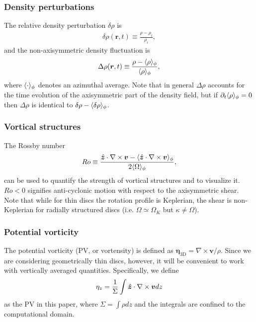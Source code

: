 \subsubsection{Density perturbations}
The relative density perturbation $\delta\rho$ is 
\begin{align}
  \delta\rho(\bm{r},t) \equiv \frac{\rho - \rho_i}{\rho_i}, 
\end{align}
and the non-axisymmetric density fluctuation is 
\begin{align}
  \Delta\rho(\bm{r},t) \equiv \frac{\rho -
    \langle \rho \rangle_\phi}{\langle \rho \rangle_\phi}, 
\end{align}
where $\langle \cdot \rangle_\phi$ denotes an azimuthal average.  
Note that in general $\Delta\rho$ accounts for the time evolution of
the axisymmetric part of the density field, but if
$\partial_t\langle \rho \rangle_\phi=0$ then $\Delta\rho$ is identical to
$\delta\rho-\langle \delta\rho \rangle_\phi$.   


\subsubsection{Vortical structures}
The Rossby number
\begin{align}
  Ro \equiv
  \frac{\hat{\bm{z}}\cdot\nabla\times\bm{v}-\langle \hat{\bm{z}}\cdot\nabla\times\bm{v} \rangle_\phi}{2\langle \Omega \rangle_\phi},   
\end{align} 
can be used to quantify the strength of vortical structures and to
visualize it. $Ro<0$ signifies anti-cyclonic motion with respect to
the axisymmetric shear. Note that while for thin discs the rotation
profile is Keplerian, the shear is non-Keplerian for radially  
structured discs (i.e. $\Omega\simeq\Omega_K$ but
$\kappa\neq\Omega$). 

\subsubsection{Potential vorticity}
The potential vorticity (PV, or vortensity) is defined as
$  \bm{\eta}_\mathrm{3D} = \nabla\times\bm{v}/\rho. $
Since we are considering geometrically thin discs, however, it will be
convenient to work with vertically averaged quantities. Specifically,
we define 
\begin{align}
  \eta_z = \frac{1}{\Sigma}\int \hat{\bm{z}}\cdot\nabla\times\bm{v} dz
\end{align}
as the PV in this paper, where $\Sigma = \int\rho dz$ and the
integrals are confined to the computational domain. 

